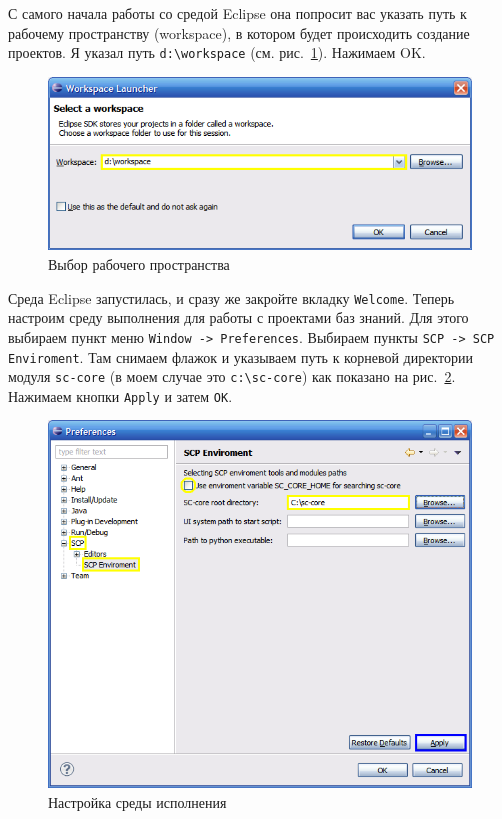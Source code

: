 С самого начала работы со средой Eclipse она попросит вас указать путь
к рабочему пространству (workspace), в котором будет происходить
создание проектов. Я указал путь \verb|d:\workspace|
(см. рис.~\ref{fig:Setup_Select_workspace}). Нажимаем OK.

\begin{figure}[h!]
  \centering
  \includegraphics[scale=0.7]{images/5/setup/1_Select_workspace}
  \caption{Выбор рабочего пространства}
  \label{fig:Setup_Select_workspace}
\end{figure}

Среда Eclipse запустилась, и сразу же закройте вкладку
\texttt{Welcome}. Теперь настроим среду выполнения для работы с
проектами баз знаний. Для этого выбираем пункт меню \texttt{Window ->
  Preferences}. Выбираем пункты \texttt{SCP -> SCP Enviroment}. Там
снимаем флажок и указываем путь к корневой директории модуля
\texttt{sc-core} (в моем случае это \verb|c:\sc-core|) как показано на
рис.~\ref{fig:Setup_Setup_scp_enviroment}. Нажимаем кнопки
\texttt{Apply} и затем \texttt{OK}.

\begin{figure}[h!]
  \centering
  \includegraphics[scale=0.7]{images/5/setup/2_Setup_scp_enviroment}
  \caption{Настройка среды исполнения}
  \label{fig:Setup_Setup_scp_enviroment}
\end{figure}

